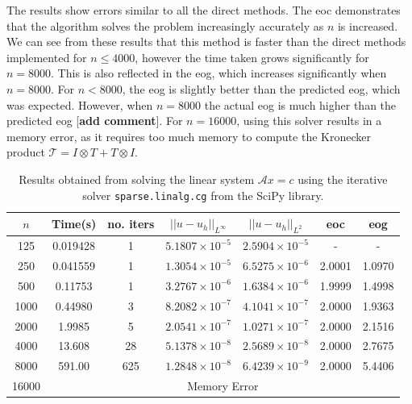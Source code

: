 \documentclass[11pt]{article}
\numberwithin{equation}{section}
\begin{document}
The results show errors similar to all the direct methods. The eoc demonstrates that the algorithm solves the problem increasingly accurately as $n$ is increased. We can see from these results that this method is faster than the direct methods implemented for $n \leq 4000$, however the time taken grows significantly for $n=8000$. This is also reflected in the eog, which increases significantly when $n=8000$. For $n<8000$, the eog is slightly better than the predicted eog, which was expected. However, when $n=8000$ the actual eog is much higher than the predicted eog [\textbf{add comment}]. For $n=16000$, using this solver results in a memory error, as it requires too much memory to compute the Kronecker product $\mathcal{T} = I \otimes T + T \otimes I$.

\begin{table}[H]
\centering
\begin{tabular}{|c|c|c|c|c|c|c|}
\hline
$n$ & Time(s) & no. iters & $|| u - u_h ||_{L^{\infty}}$ &$|| u - u_h ||_{L^{2}}$ & eoc & eog \\
\hline
125 & 0.019428 & 1 & $5.1807 \times 10^{-5}$ & $2.5904 \times 10^{-5}$ & - & - \\
250 & 0.041559 & 1 & $1.3054 \times 10^{-5}$ & $6.5275 \times 10^{-6}$ & 2.0001 & 1.0970 \\
500 & 0.11753 & 1 & $3.2767 \times 10^{-6}$ & $1.6384 \times 10^{-6}$ & 1.9999 & 1.4998 \\
1000 & 0.44980 & 3 & $8.2082 \times 10^{-7}$ & $4.1041 \times 10^{-7}$ & 2.0000 & 1.9363 \\
2000 & 1.9985 & 5 & $2.0541 \times 10^{-7}$ & $1.0271 \times 10^{-7}$ & 2.0000 & 2.1516 \\
4000 & 13.608 & 28 & $5.1378 \times 10^{-8}$ & $2.5689 \times 10^{-8}$ & 2.0000 & 2.7675 \\
8000 & 591.00 & 625 & $1.2848 \times 10^{-8}$ & $6.4239 \times 10^{-9}$ & 2.0000 & 5.4406 \\
\cline{2-7}
16000 & \multicolumn{6}{c|}{Memory Error} \\
\hline
\end{tabular}
\captionsetup{justification=centering}
\caption{Results obtained from solving the linear system $\mathcal{A} x = c$ using the iterative solver  \texttt{sparse.linalg.cg} from the SciPy library.}
\label{table:kron it}
\end{table}
\end{document}
